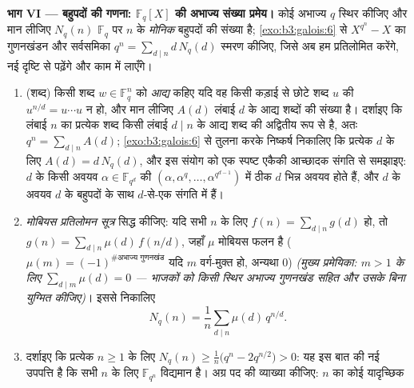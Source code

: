 \begin{problem}
\medskip
\noindent\textbf{भाग VI ---  बहुपदों की गणना: $\mathbb F_q[X]$ की
अभाज्य संख्या प्रमेय।} कोई अभाज्य  $q$ स्थिर कीजिए और मान
लीजिए $N_q(n)$ $\mathbb F_q$ पर  $n$ के \emph{मोनिक }
बहुपदों की संख्या है; \cref{exo:b3:galois:6} से $X^{q^n} - X$ का गुणनखंडन और सर्वसमिका
$q^n = \sum_{d\mid n}d\,N_q(d)$ स्मरण कीजिए, जिसे अब हम प्रतिलोमित करेंगे, नई दृष्टि से
पढ़ेंगे और काम में लाएँगे।
\begin{enumerate}[resume]
  \item (शब्द) किसी शब्द $w \in \mathbb F_q^n$ को \emph{आद्य} कहिए यदि वह किसी
        कड़ाई से छोटे शब्द $u$ की  $u^{n/d} =
        u\cdots u$ न हो, और मान
        लीजिए $A(d)$ लंबाई $d$ के आद्य शब्दों की संख्या है।
        दर्शाइए कि लंबाई $n$ का प्रत्येक शब्द किसी लंबाई
        $d \mid n$ के आद्य शब्द की अद्वितीय रूप से  है, अतः
        $q^n = \sum_{d \mid n}A(d)$; \cref{exo:b3:galois:6} से तुलना करके निष्कर्ष निकालिए कि प्रत्येक
        $d$ के लिए $A(d) = d\,N_q(d)$, और इस संयोग को एक स्पष्ट एकैकी
        आच्छादक संगति से समझाइए:  $d$ के किसी अवयव $\alpha \in
        \mathbb F_{q^d}$
        की   $(\alpha, \alpha^q, \dots, \alpha^{q^{d-1}})$ में ठीक $d$ भिन्न अवयव
        होते हैं, और  $d$ के अवयव  $d$ के 
        बहुपदों के साथ $d$-से-एक संगति में हैं।
  \item \emph{मोबियस प्रतिलोमन सूत्र} सिद्ध कीजिए: यदि सभी $n$
        के लिए $f(n) =
        \sum_{d\mid n}g(d)$ हो, तो $g(n) =
        \sum_{d\mid n}\mu(d)\,f(n/d)$, जहाँ $\mu$ मोबियस फलन है
        ($\mu(m) = (-1)^{\#\text{अभाज्य
        गुणनखंड}}$ यदि $m$ वर्ग-मुक्त हो, अन्यथा $0$)
        \emph{(मुख्य प्रमेयिका: $m >
        1$ के लिए $\sum_{d \mid m}\mu(d) = 0$ --- भाजकों
        को किसी स्थिर अभाज्य गुणनखंड सहित और उसके बिना युग्मित
        कीजिए)}। इससे निकालिए
        \[
        N_q(n) = \frac1n\sum_{d \mid n}\mu(d)\,q^{n/d} .
        \]
  \item दर्शाइए कि प्रत्येक $n \geq 1$ के लिए $N_q(n) \geq \frac1n\bigl(q^n - 2q^{n/2}\bigr) > 0$: यह इस बात की
        नई उपपत्ति है कि सभी $n$ के लिए $\mathbb F_{q^n}$ विद्यमान है।
        अग्र पद की व्याख्या कीजिए:  $n$ का कोई यादृच्छिक

\end{enumerate}
\end{problem}
